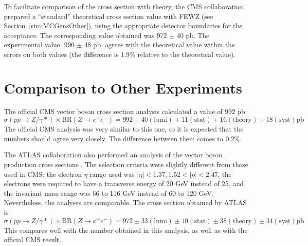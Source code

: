To facilitate comparison of the cross section 
with theory, 
the CMS collaboration prepared a ``standard'' 
theoretical cross section value with FEWZ 
(see Section~\ref{sim:MCGensOther}), 
using the appropriate detector boundaries 
for the acceptance.  
The corresponding value obtained was 
972 $\pm$ 40 pb.  
The experimental value, 990 $\pm$ 48 pb, 
agrees with the theoretical value within 
the errors on both values 
(the difference is 1.9\% relative 
to the theoretical value).  


\section{Comparison to Other Experiments}
\label{res:prev}


The official CMS vector boson cross section analysis 
\cite{CMSWZ}  
calculated a value of 992 pb: 
\[
\sigma(p \bar{p} \rightarrow Z/\gamma *) \times \mathrm{BR}(Z \rightarrow e^+ e^- )
= 992 \pm 40 \mathrm{(lumi)} \pm 11 \mathrm{(stat)} \pm 16 \mathrm{(theory)} \pm 18 \mathrm{(syst)} \mathrm{pb}
\]  
The official CMS analysis was very similar 
to this one, 
so it is expected that the numbers should 
agree very closely.  
The difference between them comes to 0.2\%.  

The ATLAS collaboration also performed an analysis 
of the vector boson production cross sections 
\cite{ATLASZ}. 
The selection criteria were slightly different 
from those used in CMS: 
the electron $\eta$ range used was 
$|\eta| < 1.37, 1.52 < |\eta| < 2.47$, 
the electrons were required to have a 
transverse energy of 20 GeV instead of 25, 
and the invariant mass range was 66 to 116 GeV 
instead of 60 to 120 GeV.  
Nevertheless, the analyses are comparable.  
The \Zee cross section obtained by ATLAS is 
\[
\sigma(p \bar{p} \rightarrow Z/\gamma *) \times \mathrm{BR}(Z \rightarrow e^+ e^- )
= 972 \pm 33 \mathrm{(lumi)} \pm 10 \mathrm{(stat)} \pm 38 \mathrm{(theory)} \pm 34 \mathrm{(syst)} \mathrm{pb} 
\]
This compares well with the number obtained 
in this analysis, 
as well as with the official CMS result.  



\clearpage